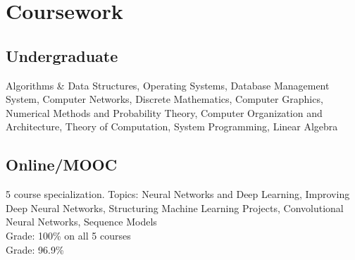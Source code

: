 
\section{Coursework}
\subsection{Undergraduate}
Algorithms \& Data Structures, Operating Systems, Database Management System, Computer Networks, Discrete Mathematics, Computer Graphics, Numerical Methods and Probability Theory, Computer Organization and Architecture, Theory of Computation, System Programming, Linear Algebra
\sectionsep

\subsection{Online/MOOC}
\textbullet{} 
5 course specialization. Topics: Neural Networks and Deep Learning, Improving Deep Neural Networks, Structuring Machine Learning Projects, Convolutional Neural Networks, Sequence Models \\
Grade: 100\% on all 5 courses \\
\textbullet{} 
Grade: 96.9\% \\
\sectionsep